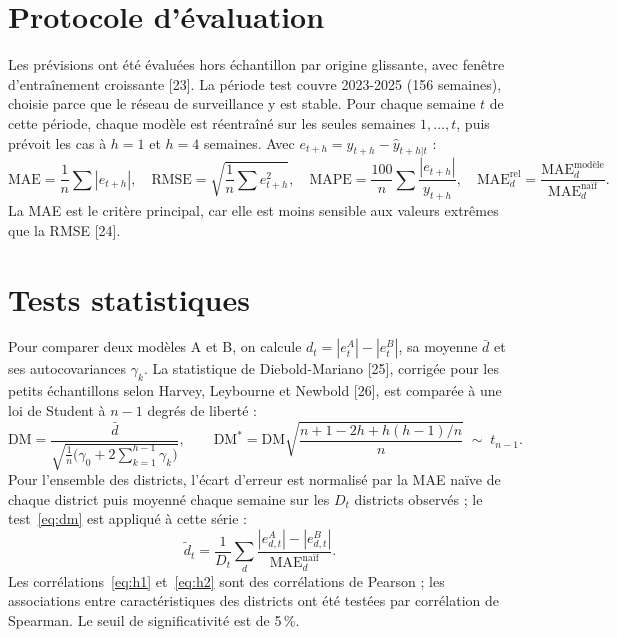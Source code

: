 \documentclass[11pt]{article}
\begin{document}
\section{Protocole d'évaluation}
Les prévisions ont été évaluées hors échantillon par origine glissante, avec fenêtre d'entraînement croissante [23]. La période test couvre 2023-2025 (156 semaines), choisie parce que le réseau de surveillance y est stable. Pour chaque semaine $t$ de cette période, chaque modèle est réentraîné sur les seules semaines $1,\dots,t$, puis prévoit les cas à $h=1$ et $h=4$ semaines. Avec $e_{t+h}=y_{t+h}-\hat{y}_{t+h|t}$ :
\begin{equation}
\text{MAE}=\frac{1}{n}\sum|e_{t+h}|,\quad \text{RMSE}=\sqrt{\frac{1}{n}\sum e_{t+h}^2},\quad \text{MAPE}=\frac{100}{n}\sum\frac{|e_{t+h}|}{y_{t+h}},\quad \text{MAE}^{\text{rel}}_d=\frac{\text{MAE}^{\text{modèle}}_d}{\text{MAE}^{\text{naïf}}_d}.
\label{eq:metrics}
\end{equation}
La MAE est le critère principal, car elle est moins sensible aux valeurs extrêmes que la RMSE [24].

\section{Tests statistiques}
Pour comparer deux modèles A et B, on calcule $d_t=|e^{A}_t|-|e^{B}_t|$, sa moyenne $\bar{d}$ et ses autocovariances $\gamma_k$. La statistique de Diebold-Mariano [25], corrigée pour les petits échantillons selon Harvey, Leybourne et Newbold [26], est comparée à une loi de Student à $n-1$ degrés de liberté :
\begin{equation}
\mathrm{DM}=\frac{\bar{d}}{\sqrt{\frac{1}{n}\big(\gamma_0+2\sum_{k=1}^{h-1}\gamma_k\big)}},\qquad \mathrm{DM}^{*}=\mathrm{DM}\sqrt{\frac{n+1-2h+h(h-1)/n}{n}}\;\sim\;t_{n-1}.
\label{eq:dm}
\end{equation}
Pour l'ensemble des districts, l'écart d'erreur est normalisé par la MAE naïve de chaque district puis moyenné chaque semaine sur les $D_t$ districts observés ; le test~\eqref{eq:dm} est appliqué à cette série :
\begin{equation}
\tilde{d}_t=\frac{1}{D_t}\sum_{d}\frac{|e^{A}_{d,t}|-|e^{B}_{d,t}|}{\text{MAE}^{\text{naïf}}_d}.
\label{eq:panel}
\end{equation}
Les corrélations~\eqref{eq:h1} et~\eqref{eq:h2} sont des corrélations de Pearson ; les associations entre caractéristiques des districts ont été testées par corrélation de Spearman. Le seuil de significativité est de 5\,\%.
\end{document}
